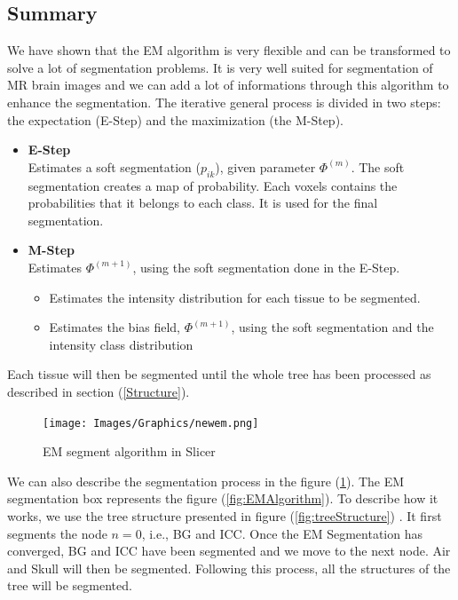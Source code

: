 \subsection{Summary}\label{SUMMARY}
We have shown that the EM algorithm is very flexible and can be transformed to solve a lot of segmentation problems. It is very well suited for segmentation of MR brain images and we can add a lot of informations through this algorithm to enhance the segmentation. The iterative general process is divided in two steps: the expectation (E-Step) and the maximization (the M-Step).

  \begin{itemize}
  \item \textbf{E-Step}\\  
  Estimates a soft segmentation ($p_{ik}$), given parameter $\Phi^{(m)}$. The soft segmentation creates a map of probability. Each voxels contains the probabilities that it belongs to each class. It is used for the final segmentation.
  
  \item \textbf{M-Step}\\
  Estimates $\Phi^{(m+1)}$, using the soft segmentation done in the E-Step.
  
    \begin{itemize}
    \item Estimates the intensity distribution for each tissue to be segmented.    
    \item Estimates the bias field, $\Phi^{(m+1)}$, using the soft segmentation and the intensity class distribution
    \end{itemize}
  \end{itemize}
  
Each tissue will then be segmented until the whole tree has been processed as described in section (\ref{Structure}).

  \begin{figure}[ht]\centering
  \texttt{[image: Images/Graphics/newem.png]}
  \caption{EM segment algorithm in Slicer}\label{fig:EMSSlicer}
  \end{figure}
  
We can also describe the segmentation process in the figure (\ref{fig:EMSSlicer}). The EM segmentation box represents the figure (\ref{fig:EMAlgorithm}). To describe how it works, we use the tree structure presented in figure (\ref{fig:treeStructure}) . It first segments the node $n=0$, i.e., BG and ICC. Once the EM Segmentation has converged, BG and ICC have been segmented and we move to the next node. Air and Skull will then be segmented. Following this process, all the structures of the tree will be segmented.
%
